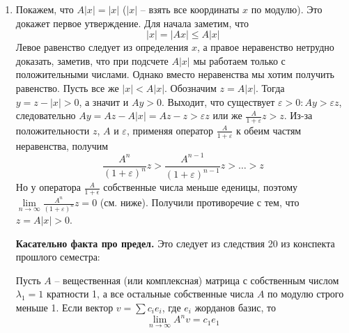   \begin{enumerate}
  	\item Покажем, что $ A|x| = |x| $ ($ |x| $ -- взять все координаты $ x $ по модулю). Это докажет первое утверждение. Для начала заметим, что 
  	$$ |x| = |Ax| \le A|x| $$ 
  	Левое равенство следует из определения $ x $, а правое неравенство нетрудно доказать, заметив, что при подсчете $ A|x| $ мы работаем только с положительными числами. Однако вместо неравенства мы хотим получить равенство. Пусть все же $ |x| < A|x| $. Обозначим $ z = A|x| $. Тогда $ y = z - |x| > 0 $, а значит и $ Ay > 0 $. Выходит, что существует $ \varepsilon > 0: Ay > \varepsilon z $, следовательно $ Ay = Az - A|x| = Az - z > \varepsilon z $ или же $ \frac{A}{1+\varepsilon} z > z $. Из-за положительности $ z $, $ A $ и $ \varepsilon $, применяя оператор $ \frac{A}{1+\varepsilon} $ к обеим частям неравенства, получим
  	$$ \frac{A^n}{(1+\varepsilon)^n}z > \frac{A^{n-1}}{(1+\varepsilon)^{n-1}}z > \ldots > z $$
  	Но у оператора $ \frac{A}{1+\epsilon} $ собственные числа меньше еденицы, поэтому $ \lim\limits_{n\to\infty} \frac{A^n}{(1+\varepsilon)^n}z = 0 $ (см. ниже). Получили противоречие с тем, что $ z = A|x| > 0 $.

  	\textbf{Касательно факта про предел.} \label{res20} Это следует из следствия 20 из конспекта прошлого семестра:

  	Пусть $ A $ -- вещественная (или комплексная) матрица с собственным числом $\lambda_1=1$ кратности 1, а все остальные собственные числа $A$ по модулю строго меньше 1. Если вектор $v= \sum c_i e_i$, где $e_i$ жорданов базис, то $$ \lim_{n \to \infty}A^nv = c_1 e_1 $$


\end{enumerate}
